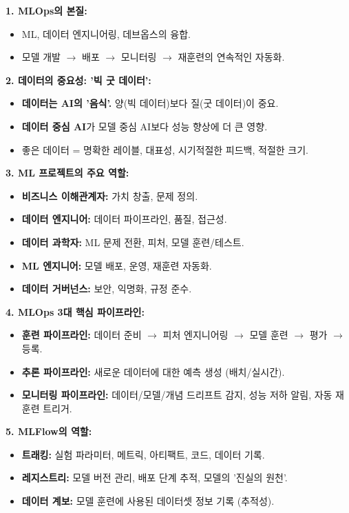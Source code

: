 \documentclass[11pt,a4paper]{article}
\theoremstyle{definition}
\begin{document}
\begin{tcolorbox}[colback=lightblue, colframe=darkblue, title=\textbf{CSCI103 Lecture 9 핵심 요약}]

\textbf{1. MLOps의 본질:}
\begin{itemize}
    \item ML, 데이터 엔지니어링, 데브옵스의 융합.
    \item 모델 개발 $\rightarrow$ 배포 $\rightarrow$ 모니터링 $\rightarrow$ 재훈련의 연속적인 자동화.
\end{itemize}

\textbf{2. 데이터의 중요성: '빅 굿 데이터':}
\begin{itemize}
    \item \textbf{데이터는 AI의 '음식'.} 양(빅 데이터)보다 질(굿 데이터)이 중요.
    \item \textbf{데이터 중심 AI}가 모델 중심 AI보다 성능 향상에 더 큰 영향.
    \item 좋은 데이터 = 명확한 레이블, 대표성, 시기적절한 피드백, 적절한 크기.
\end{itemize}

\textbf{3. ML 프로젝트의 주요 역할:}
\begin{itemize}
    \item \textbf{비즈니스 이해관계자:} 가치 창출, 문제 정의.
    \item \textbf{데이터 엔지니어:} 데이터 파이프라인, 품질, 접근성.
    \item \textbf{데이터 과학자:} ML 문제 전환, 피처, 모델 훈련/테스트.
    \item \textbf{ML 엔지니어:} 모델 배포, 운영, 재훈련 자동화.
    \item \textbf{데이터 거버넌스:} 보안, 익명화, 규정 준수.
\end{itemize}

\textbf{4. MLOps 3대 핵심 파이프라인:}
\begin{itemize}
    \item \textbf{훈련 파이프라인:} 데이터 준비 $\rightarrow$ 피처 엔지니어링 $\rightarrow$ 모델 훈련 $\rightarrow$ 평가 $\rightarrow$ 등록.
    \item \textbf{추론 파이프라인:} 새로운 데이터에 대한 예측 생성 (배치/실시간).
    \item \textbf{모니터링 파이프라인:} 데이터/모델/개념 드리프트 감지, 성능 저하 알림, 자동 재훈련 트리거.
\end{itemize}

\textbf{5. MLFlow의 역할:}
\begin{itemize}
    \item \textbf{트래킹:} 실험 파라미터, 메트릭, 아티팩트, 코드, 데이터 기록.
    \item \textbf{레지스트리:} 모델 버전 관리, 배포 단계 추적, 모델의 '진실의 원천'.
    \item \textbf{데이터 계보:} 모델 훈련에 사용된 데이터셋 정보 기록 (추적성).
\end{itemize}


\end{tcolorbox}
\end{document}
